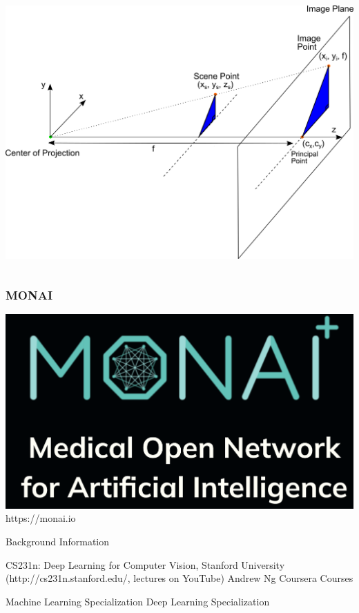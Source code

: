 \begin{frame}
\begin{columns}
\begin{column}{0.75\linewidth}
         \includegraphics[width=0.85\columnwidth]{images/perspective-projection.png}
      \end{column}
   \end{columns}
\end{frame}


\begin{frame}
   \frametitle{MONAI}
   \centering
   \includegraphics[width=0.68\linewidth]{images/monai.png}
   \vfill \tiny{https://monai.io}

\end{frame}

\begin{frame}{Background Information}
   \begin{baseitemize}
      \itemR CS231n: Deep Learning for Computer Vision, Stanford University (http://cs231n.stanford.edu/, lectures on YouTube)
      \itemR Andrew Ng Coursera Courses
      \begin{baseitemize}
         \itemR Machine Learning Specialization
         \itemR Deep Learning Specialization
      \end{baseitemize}
   \end{baseitemize}
\end{frame}

